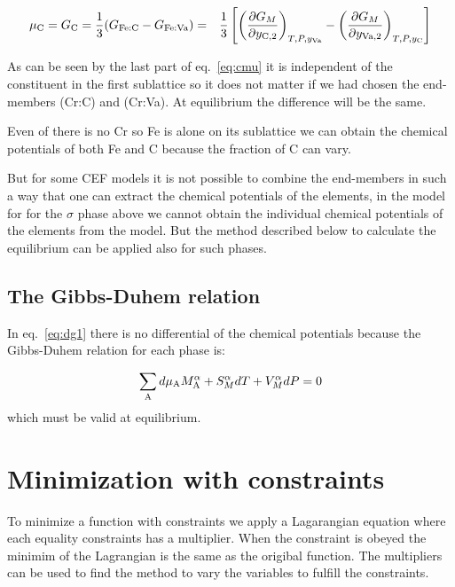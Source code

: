 \documentclass[12pt]{article}
\begin{document}
\begin{eqnarray}
\mu_{\rm C} = G_{\rm C} = \frac{1}{3}(G_{\rm Fe:C}-G_{\rm Fe:Va}) &=&
\frac{1}{3}\left[\left(\frac{\partial G_M}{\partial y_{\rm C,2}}
\right)_{T,P,y_{\rm Va}} -
\left(\frac{\partial G_M}{\partial y_{\rm Va,2}}
\right)_{T,P,y_{\rm C}}\right] \label{eq:cmu}
\end{eqnarray}

As can be seen by the last part of eq.~\ref{eq:cmu} it is independent
of the constituent in the first sublattice so it does not matter if we
had chosen the end-members (Cr:C) and (Cr:Va).  At equilibrium the
difference will be the same.

Even of there is no Cr so Fe is alone on its sublattice we can obtain
the chemical potentials of both Fe and C because the fraction of C can
vary.

But for some CEF models it is not possible to combine the end-members
in such a way that one can extract the chemical potentials of the
elements, in the model for for the $\sigma$ phase above we cannot
obtain the individual chemical potentials of the elements from the
model.  But the method described below to calculate the equilibrium
can be applied also for such phases.


\subsection{The Gibbs-Duhem relation}

In eq.~\ref{eq:dg1} there is no differential of the chemical
potentials because the Gibbs-Duhem relation for each phase is:

\begin{equation}
\sum_{\rm A}d\mu_{\rm A} M^{\alpha}_{\rm A}+S_M^{\alpha}dT+V_M^{\alpha}dP =0
\end{equation}
which must be valid at equilibrium.

\section{Minimization with constraints}

To minimize a function with constraints we apply a Lagarangian
equation where each equality constraints has a multiplier.  When the
constraint is obeyed the minimim of the Lagrangian is the same as the
origibal function.  The multipliers can be used to find the method to
vary the variables to fulfill the constraints.
\end{document}
